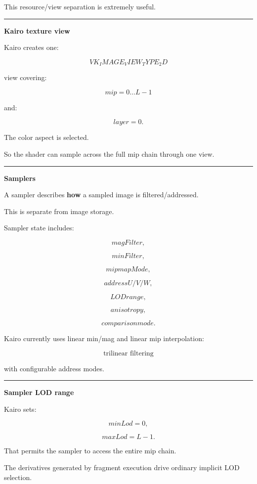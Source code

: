 This resource/view separation is extremely useful.

\begin{center}\rule{0.5\linewidth}{0.5pt}\end{center}

\textbf{Kairo texture view}

Kairo creates one:

\[
VK_IMAGE_VIEW_TYPE_2D
\]

view covering:

\[
mip=0\dots L-1
\]

and:

\[
layer=0.
\]

The color aspect is selected.

So the shader can sample across the full mip chain through one view.

\begin{center}\rule{0.5\linewidth}{0.5pt}\end{center}

\textbf{Samplers}

A sampler describes \textbf{how} a sampled image is filtered/addressed.

This is separate from image storage.

Sampler state includes:

\[
magFilter,
\]

\[
minFilter,
\]

\[
mipmapMode,
\]

\[
addressU/V/W,
\]

\[
LOD range,
\]

\[
anisotropy,
\]

\[
comparison mode.
\]

Kairo currently uses linear min/mag and linear mip interpolation:

\[
\boxed{\text{trilinear filtering}}
\]

with configurable address modes.

\begin{center}\rule{0.5\linewidth}{0.5pt}\end{center}

\textbf{Sampler LOD range}

Kairo sets:

\[
minLod=0,
\]

\[
maxLod=L-1.
\]

That permits the sampler to access the entire mip chain.

The derivatives generated by fragment execution drive ordinary implicit LOD selection.

